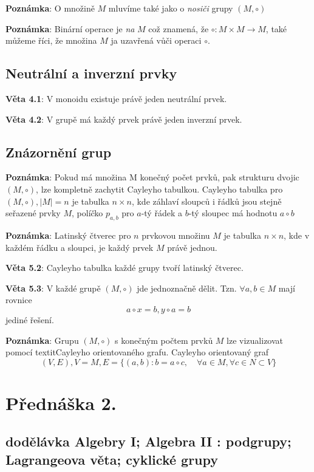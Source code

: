 \documentclass[12pt, letterpaper, twoside]{article}
\begin{document}
\textbf{Poznámka}: O množině $M$ mluvíme také jako o \textit{nosiči} grupy $(M, \circ)$

\textbf{Poznámka}: Binární operace je \textit{na} $M$ což znamená, že $\circ: M \times M \to M$,
 také můžeme říci, že množina $M$ ja uzavřená vůči operaci $\circ$.

\subsection{Neutrální a inverzní prvky}

\textbf{Věta 4.1}: V monoidu existuje právě jeden neutrální prvek.

\textbf{Věta 4.2}: V grupě má každý prvek právě jeden inverzní prvek.

\subsection{Znázornění grup}

\textbf{Poznámka}: Pokud má množina M konečný počet prvků, pak strukturu dvojic $(M, \circ)$,
 lze kompletně zachytit Cayleyho tabulkou. Cayleyho tabulka pro $(M, \circ), |M|=n$
 je tabulka $n \times n$, kde záhlaví sloupců i řádků jsou stejně seřazené prvky $M$,
 políčko $p_{a,b}$ pro $a$-tý řádek a $b$-tý sloupec má hodnotu $a \circ b$

\textbf{Poznámka}: Latinský čtverec pro $n$ prvkovou množinu $M$ je tabulka $n \times n$,
 kde v každém řádku a sloupci, je každý prvek $M$ právě jednou.

\textbf{Věta 5.2}: Cayleyho tabulka každé grupy tvoří latinský čtverec.

\textbf{Věta 5.3}: V každé grupě $(M, \circ)$ jde jednoznačně dělit.
 Tzn. $\forall a,b \in M$ mají rovnice \[a \circ x = b, y \circ a = b\] jediné řešení.

\textbf{Poznámka}: Grupu $(M, \circ)$ s konečným počtem prvků $M$ lze vizualizovat pomocí textit{Cayleyho orientovaného grafu}.
 Cayleyho orientovaný graf \[(V,E), V=M, E=\{(a,b): b=a \circ c, \quad \forall a \in M, \forall c \in N \subset V\}\]

\section{Přednáška 2.}

\subsection*{dodělávka Algebry I; Algebra II : podgrupy; Lagrangeova věta; cyklické grupy}
\end{document}
